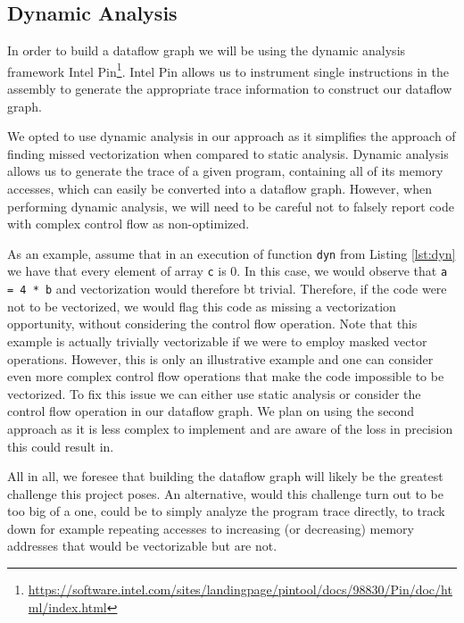\documentclass[acmsmall,review, nonacm]{acmart}
\begin{document}
\subsection{Dynamic Analysis}
In order to build a dataflow graph we will be using the dynamic analysis framework 
Intel Pin\footnote{\url{https://software.intel.com/sites/landingpage/pintool/docs/98830/Pin/doc/html/index.html}}.
Intel Pin allows us to instrument single instructions in the assembly to generate 
the appropriate trace information to construct our dataflow graph. 

We opted to use dynamic analysis in our approach as it simplifies the approach of finding missed vectorization when 
compared to static analysis. Dynamic analysis allows us to generate the trace of a given program, containing all of its memory
accesses, which can easily be converted into a dataflow graph.
However, when performing dynamic analysis, we will need to be careful not to falsely report code with 
complex control flow as non-optimized.

As an example, assume that in an execution of function \texttt{dyn} from Listing \ref{lst:dyn} 
we have that every element of array \texttt{c} is 0. In this case, we would 
observe that \texttt{a = 4 * b} and vectorization would therefore bt trivial.
Therefore, if the code were not to be vectorized, we would flag this code as missing a vectorization opportunity, 
without considering the control flow operation.
Note that this example is actually trivially vectorizable if we were to employ masked 
vector operations. However, this is only an illustrative example and one can consider even more complex control 
flow operations that make the code impossible to be vectorized. 
To fix this issue we can either use static analysis or consider the control flow operation in our dataflow graph.
We plan on using the second approach as it is less complex to implement and are aware of the loss in precision this could result in.


All in all, we foresee that building the dataflow graph will likely be the greatest challenge this project poses. An alternative,
would this challenge turn out to be too big of a one, could be to simply analyze the program trace directly, to track down for example repeating accesses
to increasing (or decreasing) memory addresses that would be vectorizable but are not.
\end{document}
